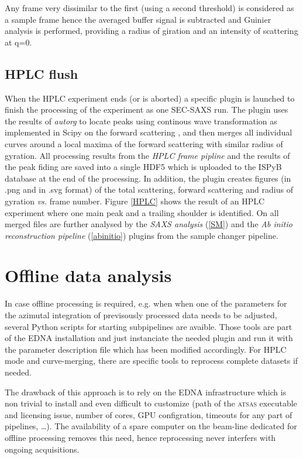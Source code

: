 \documentclass[preprint,pdf]{iucr}              %
\begin{document}
Any frame very dissimilar to the first (using a second threshold) is considered
as a sample frame hence the averaged buffer signal is subtracted and Guinier
analysis is performed, providing a radius of giration and an intensity of
scattering at q=0. 

\subsection{HPLC flush}
When the HPLC experiment ends (or is aborted) a specific plugin is launched to
finish the processing of the experiment as one SEC-SAXS run. 
The plugin uses the results of \textit{autorg} to locate peaks using continous
wave transformation as implemented in Scipy on the forward scattering
\cite{cwt, scipy}, and then merges all individual curves around a local maxima
of the forward scattering with similar radius of gyration. 
All processing results from the \textit{HPLC frame pipline} and the results of 
the peak fiding are saved into a single HDF5 which is uploaded to the ISPyB
database at the end of the processing. 
In addition, the plugin creates figures (in .png and in .svg format) of the
total scattering, forward scattering and radius of gyration \textit{vs.} frame
number. 
Figure \ref{HPLC} shows the result of an HPLC experiment where one main peak and
a trailing shoulder is identified. 
On all merged files are further analysed by the \textit{SAXS analysis}
(\ref{SM}) and the \textit{Ab initio reconstruction pipeline}
(\ref{abinitio}) plugins from the sample changer pipeline.

\section{Offline data analysis}
In case offline processing is required, e.g. when when one of the parameters for
the azimutal integration of previsously processed data needs to be adjusted, 
several Python scripts for starting subpipelines are avaible. 
Those tools are part of the EDNA installation and just instanciate the needed
plugin and run it with the parameter description file which has been modified
accordingly. 
For HPLC mode and curve-merging, there are specific tools to reprocess complete
datasets if needed.

The drawback of this approach is to rely on the EDNA infrastructure which is
non trivial to install and even difficult to customize (path of the
\textsc{atsas} executable and licensing issue, number of cores, GPU
configration, timeouts for any part of pipelines, \ldots). 
The availability of a spare computer on the beam-line dedicated for offline
processing removes this need, hence reprocessing never interfers with ongoing
acquisitions.
\end{document}
